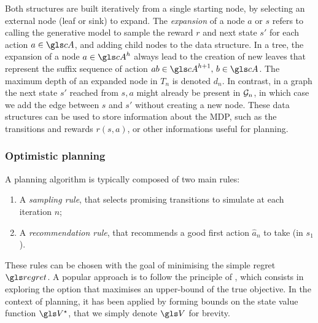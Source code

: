 Both structures are built iteratively from a single starting node, by selecting an external node (leaf or sink) to expand. The \emph{expansion} of a node $a$ or $s$ refers to calling the generative model to sample the reward $r$ and next state $s'$ for each action $a\in \cA$, and adding child nodes to the data structure. In a tree, the expansion of a node $a\in \cA^h$ always lead to the creation of new leaves that represent the suffix sequence of action $ab\in \cA^{h+1},\, b\in \cA$. The maximum depth of an expanded node in $T_n$ is denoted $d_n$. In contrast, in a graph the next state $s'$ reached from $s,a$ might already be present in $\mathcal{G}_n$, in which case we add the edge between $s$ and $s'$ without creating a new node.
These data structures can be used to store information about the \gls{MDP}, such as the transitions and rewards $r(s, a)$, or other informations useful for planning.



\subsubsection{Optimistic planning}

A planning algorithm is typically composed of two main rules:
\begin{enumerate}[label=(\roman*)]
	\item A \emph{sampling rule}, that selects promising transitions to simulate at each iteration $n$;
	\item A \emph{recommendation rule}, that recommends a good first action $\hat{a}_n$ to take (in $s_1$).
\end{enumerate}

These rules can be chosen with the goal of minimising the simple regret $\regret$.
A popular approach is to follow the principle of  \citep[see][]{Munos2014}, which consists in exploring the option that maximises an upper-bound of the true objective. In the context of planning, it has been applied by forming bounds on the state value function $\V^\star$, that we simply denote $\V$ for brevity.

